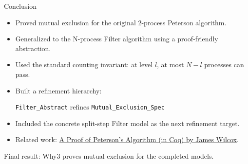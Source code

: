 \documentclass[aspectratio=169,10pt]{beamer}
\begin{document}
\begin{frame}{Conclusion}
\begin{itemize}
  \item Proved mutual exclusion for the original 2-process Peterson algorithm.
  \item Generalized to the N-process Filter algorithm using a proof-friendly abstraction.
  \item Used the standard counting invariant: at level $l$, at most $N-l$ processes can pass.
  \item Built a refinement hierarchy:
  \begin{center}
    \texttt{Filter\_Abstract} refines \texttt{Mutual\_Exclusion\_Spec}
  \end{center}
  \item Included the concrete split-step Filter model as the next refinement target.
  \item Related work: \textcolor{blue}{\href{https://jamesrwilcox.com/SharedMem.html}{A Proof of Peterson's Algorithm (in Coq) by James Wilcox}}.
\end{itemize}

\vspace{0.25cm}
\begin{center}
\large Final result: Why3 proves mutual exclusion for the completed models.
\end{center}
\end{frame}
\end{document}
